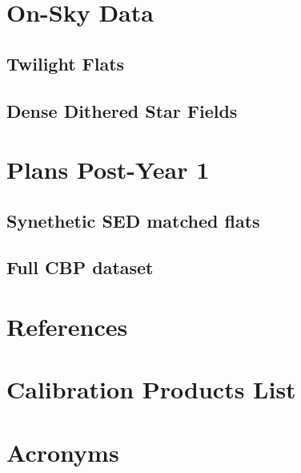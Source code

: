\documentclass[SE,authoryear,toc]{article}
\begin{document}
\section{On-Sky Data}
\subsection{Twilight Flats}
\subsection{Dense Dithered Star Fields}

\section{Plans Post-Year 1}
\subsection{Synethetic SED matched flats}
\subsection{Full CBP dataset}
\section{References} \label{sec:bib}
\renewcommand{\refname}{} %


\appendix
\section{Calibration Products List}

\section{Acronyms} \label{sec:acronyms}

\end{document}

